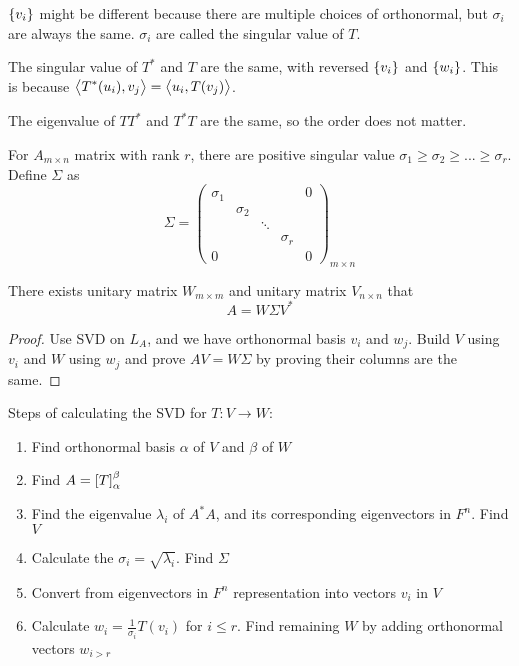 \begin{definition}
    $\set{v_i}$ might be different because there are multiple choices of orthonormal, but $\sigma_i$ are always the same. $\sigma_i$ are called the singular value of $T$.
\end{definition}


The singular value of $T^*$ and $T$ are the same, with reversed $\set{v_i}$ and $\set{w_i}$. This is because $\innerproduct{T^*(u_i)}{v_j} = \innerproduct{u_i}{T(v_j)}$.


The eigenvalue of $TT^*$ and $T^*T$ are the same, so the order does not matter.

\begin{theorem}
    For $A_{m \times n}$ matrix with rank $r$, there are positive singular value $\sigma_1 \geq \sigma_2 \geq ... \geq \sigma_r$. Define $\Sigma$ as
    \begin{equation}
        \Sigma = \begin{pmatrix}
            \sigma_1 & & & & 0 \\
             & \sigma_2 \\
             &  & \ddots &  \\
             &  &  &\sigma_r \\
            0 & & &  & 0
        \end{pmatrix}_{m \times n}
    \end{equation}
    
    There exists unitary matrix $W_{m \times m}$ and unitary matrix $V_{n \times n}$ that
    \begin{equation}
        A = W \Sigma V^*
    \end{equation}
\end{theorem}
\begin{proof}
    Use SVD on $L_A$, and we have orthonormal basis $v_i$ and $w_j$. Build $V$ using $v_i$ and $W$ using $w_j$ and prove $AV = W \Sigma$ by proving their columns are the same.
\end{proof}

Steps of calculating the SVD for $T:V \rightarrow W$:
\begin{enumerate}
    \item Find orthonormal basis $\alpha$ of $V$ and $\beta$ of $W$
    \item Find $A = \coordinate{T}_\alpha^\beta$
    \item Find the eigenvalue $\lambda_i$ of $A^*A$, and its corresponding eigenvectors in $F^n$. Find $V$
    \item Calculate the $\sigma_i = \sqrt{\lambda_i}$. Find $\Sigma$
    \item Convert from eigenvectors in $F^n$ representation into vectors $v_i$ in $V$
    \item Calculate $\displaystyle w_i = \frac{1}{\sigma_i} T(v_i)$ for $i \leq r$. Find remaining $W$ by adding orthonormal vectors $w_{i > r}$
\end{enumerate}

